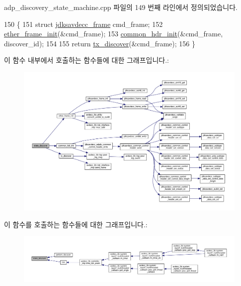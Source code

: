 adp\+\_\+discovery\+\_\+state\+\_\+machine.\+cpp 파일의 149 번째 라인에서 정의되었습니다.


\begin{DoxyCode}
150 \{
151     \textcolor{keyword}{struct }\hyperlink{structjdksavdecc__frame}{jdksavdecc\_frame} cmd\_frame;
152     \hyperlink{classavdecc__lib_1_1adp__discovery__state__machine_a0a43868a3e99a6cef740e4562d006345}{ether\_frame\_init}(&cmd\_frame);
153     \hyperlink{classavdecc__lib_1_1adp__discovery__state__machine_a603d5c117d4eb54e5b212ab96973089a}{common\_hdr\_init}(&cmd\_frame, discover\_id);
154 
155     \textcolor{keywordflow}{return} \hyperlink{classavdecc__lib_1_1adp__discovery__state__machine_afaadacc9caf0e6254a11fc743f5b635b}{tx\_discover}(&cmd\_frame);
156 \}
\end{DoxyCode}


이 함수 내부에서 호출하는 함수들에 대한 그래프입니다.\+:
\nopagebreak
\begin{figure}[H]
\begin{center}
\leavevmode
\includegraphics[width=350pt]{classavdecc__lib_1_1adp__discovery__state__machine_aacf39a8cb2b222d467c0b66f5f740166_cgraph}
\end{center}
\end{figure}




이 함수를 호출하는 함수들에 대한 그래프입니다.\+:
\nopagebreak
\begin{figure}[H]
\begin{center}
\leavevmode
\includegraphics[width=350pt]{classavdecc__lib_1_1adp__discovery__state__machine_aacf39a8cb2b222d467c0b66f5f740166_icgraph}
\end{center}
\end{figure}


